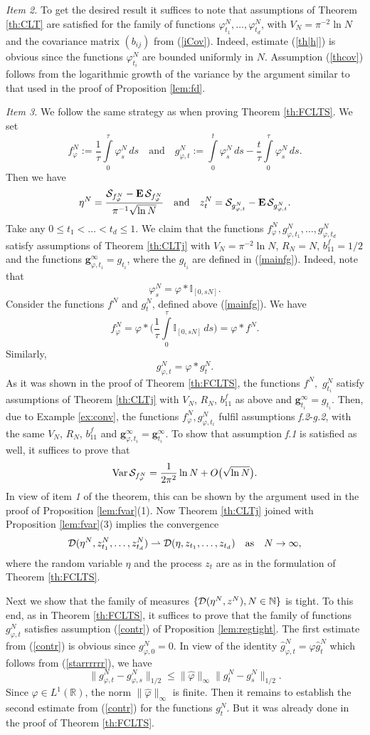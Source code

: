 \documentclass{article}
\numberwithin{equation}{section}
\newcommand{\mR}{\mathbb{R}}
\newcommand{\mN}{\mathbb{N}}
\newcommand{\mI}{\mathbb{I}}
\newcommand{\DD}{{\cal D}}
\newcommand{\SSS}{{\cal S}}
\newcommand{\ph}{\varphi}
\newcommand{\Var}{\operatorname{Var}}
\newcommand{\ssk}{\smallskip}
\newcommand{\MO}{\mbox{\bf E}\,}
\newcommand{\ra}{\rightarrow}
\newcommand{\raw}{\rightharpoonup}
\newcommand{\fr}{\frac}
\newcommand{\qmb}{\quad\mbox}
\newcommand{\qu}{\quad}
\newcommand{\qnd}{\quad\mbox{and}\quad}
\newcommand{\ili}{\int\limits}
\newcommand{\lbl}{\label}
\newcommand{\ass}{\quad\mbox{as}\quad}
\newcommand{\rprop}{Proposition \nolinebreak}
\newcommand{\rtheo}{Theorem \nolinebreak}
\newcommand{\bee}{\begin{equation}}
\newcommand{\eee}{\end{equation}}
\newcommand{\non}{\nonumber}
\begin{document}
{\it Item 2.}
To get the  desired result
it suffices to note that
assumptions of \rtheo \ref{th:CLT}
are satisfied for
the family of functions $\ph_{t_1}^N,\ldots,\ph_{t_d}^N$,
with $V_N=\pi^{-2}\ln N$
and the covariance matrix $(b_{ij})$ from (\ref{iCov}).
Indeed, estimate (\ref{th|h|}) is obvious
since the functions $\ph_{t_i}^N$ are bounded uniformly in $N$.
Assumption (\ref{thcov}) follows from the logarithmic growth of the variance
by the argument similar to that used in the proof of \rprop\ref{lem:fd}.


\ssk
{\it Item 3.}
We follow the same strategy as when proving \rtheo \ref{th:FCLTS}.
We set
\bee\non
f_\ph^N:=\fr{1}{\tau}\ili_{0}^{\tau} \ph^N_s\,ds
\qnd
g_{\ph,t}^N:=\ili_0^t \ph^N_s \,ds - \fr{t}{\tau}\ili_0^{\tau} \ph^N_s \,ds.
\eee
Then we have
$$
\eta^N=\fr{\SSS_{f_\ph^N}-\MO \SSS_{f_\ph^N}}{\pi^{-1}\sqrt{\ln N}}
\qmb{and}\qu
z_t^N=\SSS_{g_{\ph,t}^N}-\MO \SSS_{g_{\ph,t}^N}.
$$
Take any $0\leq t_1<\ldots<t_d\leq 1$.
We claim that the functions
$f_\ph^N,g^N_{\ph,t_1},\ldots,g^N_{\ph,t_d}$
satisfy assumptions of \rtheo \ref{th:CLTj}
with
$V_N=\pi^{-2}\ln N$, $R_N=N$,
$b_{11}^f=1/2$ and
the functions $\bm g^\infty_{\ph,t_i}=g_{t_i}$,
where the $g_{t_i}$ are defined in (\ref{mainfg}).
Indeed, note that
$$
\ph_s^N=\ph*\mI_{[0,sN]}.
$$
Consider the functions $f^N$ and $g^N_t$, defined above (\ref{mainfg}).
We have
$$
f_\ph^N=\ph*\Big(\fr{1}{\tau}\ili_{0}^{\tau} \mI_{[0,sN]} \, ds\Big) = \ph*f^N.
$$
Similarly,
\bee\lbl{starrrrrr}
g^N_{\ph,t}= \ph*g_t^N.
\eee
As it was shown in the proof of \rtheo \ref{th:FCLTS},
the functions
$f^N,$ $g_{t_i}^N$
satisfy assumptions of \rtheo\ref{th:CLTj}
with $V_N$, $R_N$, $b_{11}^f$ as above and $\bm g^\infty_{t_i}=g_{t_i}$.
Then, due to Example \nolinebreak \ref{ex:conv},
the functions $f_\ph^N,g^N_{\ph,t_i}$ fulfil assumptions \emph{f.2}-\emph{g.2},
with the same $V_N$, $R_N$, $b_{11}^f$ and $\bm g^\infty_{\ph,t_i}=\bm g^\infty_{t_i}$.
To show that assumption \emph{f.1} is satisfied as well,
it suffices to prove that
$$
\Var \SSS_{f_\ph^N} = \fr{1}{2\pi^2}\ln N + O \big(\sqrt{\ln N}\big).
$$
In view of item {\it 1} of the theorem, this can be shown
by the argument used in the proof of \rprop\ref{lem:fvar}(1).
Now \rtheo\ref{th:CLTj} joined with \rprop\ref{lem:fvar}(3) implies the convergence
\bee\lbl{fdierg}
\DD(\eta^N,z^N_{t_1},\ldots,z^N_{t_d}) \raw \DD(\eta,z_{t_1},\ldots,z_{t_d}) \ass N\ra\infty,
\eee
where the random variable $\eta$ and the process $z_t$
are as in the formulation of \rtheo\ref{th:FCLTS}.

Next we show that the family of measures
$\{\DD(\eta^N,z^N), N\in\mN\}$
is tight. To this end, as in \rtheo\ref{th:FCLTS},
it suffices to prove that
the family of functions $g^N_{\ph,t}$ satisfies assumption (\ref{contr})
of \rprop \ref{lem:regtight}. The first estimate from (\ref{contr})
is obvious since $g^N_{\ph,0}=0$.
In view of the identity $\hat g_{\ph,t}^N= \hat\ph\hat g_t^N$
which follows from (\ref{starrrrrr}),
we have
$$
\|g_{\ph,t}^N-g_{\ph,s}^N\|_{1/2}\leq \|\hat\ph\|_\infty \|g^N_t-g^N_s\|_{1/2}.
$$
Since $\ph\in L^1(\mR)$, the norm $\|\hat\ph\|_\infty$ is finite.
Then it remains to establish the second estimate from (\ref{contr}) for
the functions $g^N_t$. But it was already done
in the proof of \rtheo\ref{th:FCLTS}.
\end{document}
